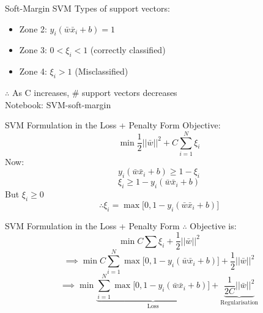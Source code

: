 \documentclass{beamer}
\begin{document}
	\begin{frame}{Soft-Margin SVM}
		Types of support vectors:
		\begin{itemize}
			\item Zone 2: $y_{i}(\bar{w}\bar{x}_{i} + b) = 1$
			\item Zone 3: $0 < \xi_{i} < 1$ (correctly classified)
			\item Zone 4: $\xi_{i} > 1$ (Misclassified)
		\end{itemize}
		$\therefore$ As C increases, \# support vectors decreases \\
		\vspace{1cm}
		Notebook: SVM-soft-margin
	\end{frame}
	\begin{frame}{SVM Formulation in the Loss + Penalty Form}
		Objective:
		$$\min \frac{1}{2}\lvert\lvert\bar{w}\rvert\rvert^{2} + C\sum_{i=1}^{N}\xi_{i}$$
		Now:
		$$y_{i}(\bar{w}\bar{x}_{i} + b) \geq 1 - \xi_{i}$$
		$$\xi_{i} \geq 1 - y_{i}(\bar{w}\bar{x}_{i} + b)$$
		But $\xi_{i} \geq 0$ \\
		$$\therefore \xi_{i} = \max \big[0, 1 - y_{i}(\bar{w}\bar{x}_{i} + b)\big]$$
	\end{frame}
	\begin{frame}{SVM Formulation in the Loss + Penalty Form}
		$\therefore$ Objective is:
		$$\min C \sum \xi_{i} + \frac{1}{2}\lvert\lvert\bar{w}\rvert\rvert^{2}$$
		$$\implies \min C \sum_{i=1}^{N} \max\big[0, 1 - y_{i}(\bar{w}\bar{x}_{i} + b)\big] + \frac{1}{2}\lvert\lvert\bar{w}\rvert\rvert^{2}$$
		$$\implies \min \underbrace{\sum_{i=1}^{N}\max \big[0, 1-y_{i}(\bar{w}\bar{x}_{i} + b)\big]}_\text{Loss} + \underbrace{ \frac{1}{2C}\lvert\lvert\bar{w}\rvert\rvert^{2}}_\text{Regularisation}$$
	\end{frame}
	

{
	
}
\end{document}
